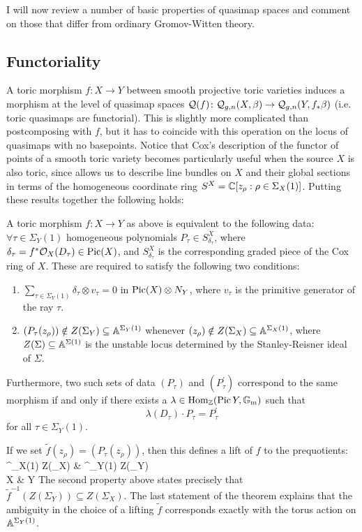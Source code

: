 \smallskip

I will now review a number of basic properties of quasimap spaces and comment on those that differ from ordinary Gromov-Witten theory.

\subsection{Functoriality}\label{sec:functoriality} A toric morphism $f\colon X\to Y$ between smooth projective toric varieties induces a morphism at the level of quasimap spaces $\mathcal{Q}(f)\colon \mathcal{Q}_{g,n}(X,\beta)\rightarrow\mathcal{Q}_{g,n}(Y,f_*\beta)$ (i.e. toric quasimaps are functorial). This is slightly more complicated than postcomposing with $f$, but it has to coincide with this operation on the locus of quasimaps with no basepoints. Notice that Cox's description of the functor of points of a smooth toric variety becomes particularly useful when the source $X$ is also toric, since \cite{CoxRing} allows us to describe line bundles on $X$ and their global sections in terms of the homogeneous coordinate ring $S^X = \mathbb{C}[z_\rho : \rho \in \Sigma_X(1)]$. Putting these results together the following holds:

\begin{thm} \cite[Theorem 3.2]{CoxFunctor} \label{CoxTheorem} A toric morphism $f:X \to Y$ as above is equivalent to the following data: $\forall \tau \in \Sigma_Y(1)$ homogeneous polynomials $P_\tau \in S^X_{\delta_\tau}$,
where $\delta_\tau = f^* \mathcal{O}_X(D_\tau) \in \operatorname{Pic}(X)$, and $S^X_{\delta_\tau}$ is the corresponding graded piece of the Cox ring of $X$. These are required to satisfy the following two conditions:
\begin{enumerate}
\item $\sum_{\tau \in \Sigma_Y(1)} \delta_\tau \otimes v_\tau = 0$ in $\operatorname{Pic}(X) \otimes N_Y$, where $v_\tau$ is the primitive generator of the ray $\tau$.
\item $(P_\tau(z_\rho)) \notin Z(\Sigma_Y) \subseteq \mathbb{A}^{\Sigma_Y(1)}$ whenever $(z_\rho) \notin Z(\Sigma_X) \subseteq \mathbb{A}^{\Sigma_X(1)}$, where $Z(\Sigma)\subseteq\mathbb{A}^{\Sigma(1)}$ is the unstable locus determined by the Stanley-Reisner ideal of $\Sigma$.
\end{enumerate}
Furthermore, two such sets of data $(P_\tau)$ and $(P^\prime_\tau)$ correspond to the same morphism if and only if there exists a $\lambda \in \operatorname{Hom}_{\mathbb{Z}}(\operatorname{Pic} Y, \mathbb{G}_{\text{m}})$ such that
\begin{equation*} \lambda(D_\tau) \cdot P_\tau = P^\prime_\tau \end{equation*}
for all $\tau \in \Sigma_Y(1)$. 
\end{thm}
\noindent If we set $\tilde{f}(z_\rho) = (P_\tau(z_\rho))$, then this defines a lift of $f$ to the prequotients:
\bcd
\Aaff^{\Sigma_X(1)} \setminus Z(\Sigma_X) \ar[r, "\tilde{f}"] \ar[d, "q_X"] & \Aaff^{\Sigma_Y(1)} \setminus Z(\Sigma_Y) \ar[d,"q_Y"] \\
X \ar[r, "f"] & Y
\ecd
The second property above states precisely that $\tilde{f}^{-1}(Z(\Sigma_Y))\subseteq Z(\Sigma_X)$. The last statement of the theorem explains that the ambiguity in the choice of a lifting $\tilde{f}$ corresponds exactly with the torus action on $\mathbb{A}^{\Sigma_Y(1)}$.

